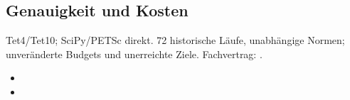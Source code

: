 \subsection{Genauigkeit und Kosten}
\label{sec:vv-cost}
Tet4/Tet10; SciPy/PETSc direkt. 72 historische Läufe, unabhängige Normen; unveränderte Budgets und unerreichte Ziele.
Fachvertrag: .
\begin{itemize}
\item {}
\item {}
\end{itemize}
